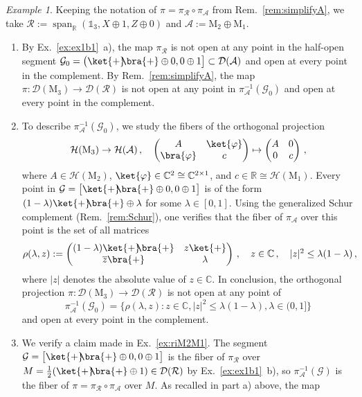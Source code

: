 \documentclass[a4paper,11pt,reqno]{amsart}
\newcommand{\C}{\mathbb{C}}
\newcommand{\R}{\mathbb{R}}
\newcommand{\M}{\mathrm{M}}
\newcommand{\cA}{\mathcal{A}}
\newcommand{\cD}{\mathcal{D}}
\newcommand{\cG}{\mathcal{G}}
\newcommand{\cH}{\mathcal{H}}
\newcommand{\cR}{\mathcal{R}}
\newcommand{\id}{\mathds{1}}
\DeclareMathOperator\spn{span}
\theoremstyle{definition}
\theoremstyle{remark}
\newtheorem{exa}[thm]{Example}
\numberwithin{equation}{section}
\begin{document}
\begin{exa}\label{ex:ex1c}
Keeping the notation of $\pi=\pi_\cR\circ\pi_\cA$ from 
Rem.~\ref{rem:simplifyA}, we take $\cR:=\spn_\R(\id_3,X\oplus 1,Z\oplus 0)$
and $\cA:=\M_2\oplus\M_1$.
\begin{enumerate}
\item[a)]
By Ex.~\ref{ex:ex1b1}~a), the map $\pi_\cR$ is not open at any point in the 
half-open segment 
$\cG_0=\big(\ket{+}\!\!\bra{+}\oplus0,0\oplus 1\big]\subset\cD(\cA)$ and 
open at every point in the complement. By Rem.~\ref{rem:simplifyA}, the map 
$\pi:\cD(\M_3)\to\cD(\cR)$ is not open at any point in $\pi_\cA^{-1}(\cG_0)$ 
and open at every point in the complement.
%
\item[b)]
To describe $\pi_\cA^{-1}(\cG_0)$, we study the fibers of the orthogonal 
projection 
\[\textstyle
\cH(\M_3)\to\cH(\cA)\,,
\quad
\begin{pmatrix}
A & \ket{\varphi}\\
\bra{\varphi} & c
\end{pmatrix}
\mapsto
\begin{pmatrix}
A & 0\\
0 & c
\end{pmatrix}\,,
\]
where $A\in\cH(\M_2)$, $\ket{\varphi}\in\C^2\cong\C^{2\times 1}$, and 
$c\in\R\cong\cH(\M_1)$. Every point in 
$\cG=\big[\ket{+}\!\!\bra{+}\oplus0,0\oplus 1\big]$ is of the form 
$(1-\lambda)\ket{+}\!\!\bra{+}\oplus\lambda$ for some $\lambda\in[0,1]$. 
Using the generalized Schur complement (Rem.~\ref{rem:Schur}), one 
verifies that the fiber of $\pi_\cA$ over this point is the set of all 
matrices
\[\textstyle
\rho(\lambda,z):=
\begin{pmatrix}
(1-\lambda)\ket{+}\!\!\bra{+} & z\ket{+}\\
\overline{z}\bra{+} & \lambda
\end{pmatrix}\,,
\quad
z\in\C\,,
\quad
|z|^2\leq\lambda(1-\lambda)\,,
\]
where $|z|$ denotes the absolute value of $z\in\C$. In conclusion, the 
orthogonal projection $\pi:\cD(\M_3)\to\cD(\cR)$ is not open at any point 
of
\[\textstyle
\pi_\cA^{-1}(\cG_0)
=\{\rho(\lambda,z)\colon 
z\in\C, |z|^2\leq\lambda(1-\lambda),
\lambda\in(0,1]\}
\]
and open at every point in the complement.
%
\item[c)]
We verify a claim made in Ex.~\ref{ex:riM2M1}. The segment 
$\cG=\big[\ket{+}\!\!\bra{+}\oplus0,0\oplus 1\big]$ is the fiber of 
$\pi_\cR$ over $M=\frac{1}{2}(\ket{+}\!\!\bra{+}\oplus 1)\in\cD(\cR)$ by
Ex.~\ref{ex:ex1b1}~b), so $\pi_\cA^{-1}(\cG)$ is the fiber of 
$\pi=\pi_\cR\circ\pi_\cA$ over $M$. As recalled in part a) above, the map 

\end{enumerate}
\end{exa}
\end{document}
